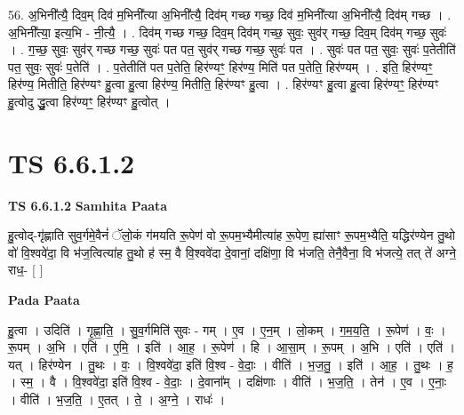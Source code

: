 \documentclass[17pt]{extarticle}
\begin{document}
56. अ॒भिनी᳚त्यै॒ दिव॒म् दिव॑ म॒भिनी᳚त्या अ॒भिनी᳚त्यै॒ दिव॑म् गच्छ गच्छ॒ दिव॑ म॒भिनी᳚त्या अ॒भिनी᳚त्यै॒ दिव॑म् गच्छ । . अ॒भिनी᳚त्या॒ इत्य॒भि - नी॒त्यै॒ । . दिव॑म् गच्छ गच्छ॒ दिव॒म् दिव॑म् गच्छ॒ सुवः॒ सुव॑र् गच्छ॒ दिव॒म् दिव॑म् गच्छ॒ सुवः॑ । . ग॒च्छ॒ सुवः॒ सुव॑र् गच्छ गच्छ॒ सुवः॑ पत पत॒ सुव॑र् गच्छ गच्छ॒ सुवः॑ पत । . सुवः॑ पत पत॒ सुवः॒ सुवः॑ प॒तेतीति॑ पत॒ सुवः॒ सुवः॑ प॒तेति॑ । . प॒तेतीति॑ पत प॒तेति॒ हिर॑ण्यꣳ॒॒ हिर॑ण्य॒ मिति॑ पत प॒तेति॒ हिर॑ण्यम् । . इति॒ हिर॑ण्यꣳ॒॒ हिर॑ण्य॒ मितीति॒ हिर॑ण्यꣳ हु॒त्वा हु॒त्वा हिर॑ण्य॒ मितीति॒ हिर॑ण्यꣳ हु॒त्वा । . हिर॑ण्यꣳ हु॒त्वा हु॒त्वा हिर॑ण्यꣳ॒॒ हिर॑ण्यꣳ हु॒त्वोदु द्धु॒त्वा हिर॑ण्यꣳ॒॒ हिर॑ण्यꣳ हु॒त्वोत् । \newline
\pagebreak
{}

\section{ TS 6.6.1.2 }

\textbf{TS 6.6.1.2 } \newline
\textbf{Samhita Paata} \newline

हु॒त्वोद्-गृ॑ह्णाति सुव॒र्गमे॒वैनं॑ ॅलो॒कं ग॑मयति रू॒पेण॑ वो रू॒पम॒भ्यैमीत्या॑ह रू॒पेण॒ ह्या॑साꣳ रू॒पम॒भ्यैति॒ यद्धिर॑ण्येन तु॒थो वो॑ वि॒श्ववे॑दा॒ वि भ॑ज॒त्वित्या॑ह तु॒थो ह॑ स्म॒ वै वि॒श्ववे॑दा दे॒वानां॒ दक्षि॑णा॒ वि भ॑जति॒ तेनै॒वैना॒ वि भ॑जत्ये॒ तत् ते॑ अग्ने॒ राध॒- [  ] \newline

\textbf{Pada Paata} \newline

हु॒त्वा । उदिति॑ । गृ॒ह्णा॒ति॒ । सु॒व॒र्गमिति॑ सुवः - गम् । ए॒व । ए॒न॒म् । लो॒कम् । ग॒म॒य॒ति॒ । रू॒पेण॑ । वः॒ । रू॒पम् । अ॒भि । एति॑ । ए॒मि॒ । इति॑ । आ॒ह॒ । रू॒पेण॑ । हि । आ॒सा॒म् । रू॒पम् । अ॒भि । एति॑ । एति॑ । यत् । हिर॑ण्येन । तु॒थः । वः॒ । वि॒श्ववे॑दा॒ इति॑ वि॒श्व - वे॒दाः॒ । वीति॑ । भ॒ज॒तु॒ । इति॑ । आ॒ह॒ । तु॒थः । ह॒ । स्म॒ । वै । वि॒श्ववे॑दा॒ इति॑ वि॒श्व - वे॒दाः॒ । दे॒वाना᳚म् । दक्षि॑णाः । वीति॑ । भ॒ज॒ति॒ । तेन॑ । ए॒व । ए॒नाः॒ । वीति॑ । भ॒ज॒ति॒ । ए॒तत् । ते॒ । अ॒ग्ने॒ । राधः॑ ।  \newline
\end{document}
